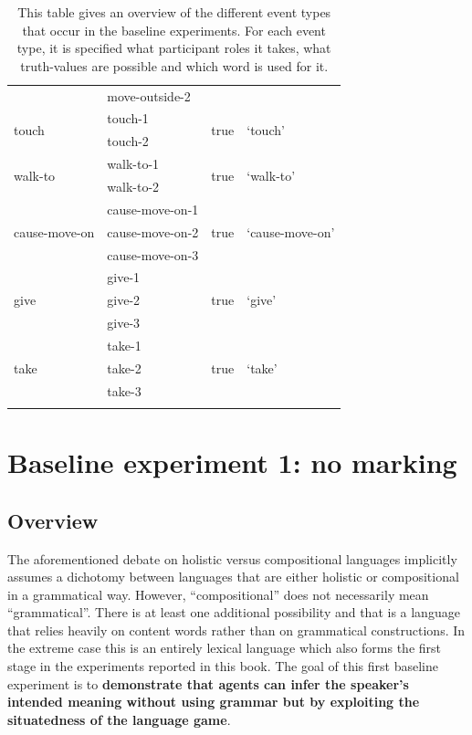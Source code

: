 \begin{table}[htp]
\begin{tabular}{llll}
\\
  &  move-outside-2 & &
\\[.3em]\multirow{2}{*}{touch } &   touch-1 & \multirow{2}{*}{true} & \multirow{2}{*}{`touch'}
\\
 &  touch-2 & &
\\[.3em]\multirow{2}{*}{walk-to } &  walk-to-1 & \multirow{2}{*}{true} & \multirow{2}{*}{`walk-to'}
\\
 &  walk-to-2 & &
\\[.3em]\multirow{3}{*}{cause-move-on } &  cause-move-on-1 & \multirow{3}{*}{true} & \multirow{3}{*}{`cause-move-on'}
\\
  &  cause-move-on-2  & &
\\
  &  cause-move-on-3  & &
\\[.3em]\multirow{3}{*}{give } &  give-1 & \multirow{3}{*}{true} & \multirow{3}{*}{`give'}
\\
 &   give-2 & &
\\
  &  give-3  & &
\\[.3em]\multirow{3}{*}{take } & take-1 & \multirow{3}{*}{true} & \multirow{3}{*}{`take'}
\\
  &   take-2  & &
\\
 &   take-3  & &
\\
\lspbottomrule
 \end{tabular}
\caption[Event-types and their corresponding words]{This table gives an overview of the different event types that occur in the baseline experiments. For each event type, it is specified what participant roles it takes, what truth-values are possible and which word is used for it.}
\label{t:events}
\end{table}

\section{Baseline experiment 1: no marking}
\label{s:base1}

\subsection{Overview}

The aforementioned debate on holistic versus compositional languages implicitly assumes a dichotomy between languages that are either holistic or compositional in a grammatical way. However,  ``compositional'' does not necessarily mean ``grammatical''. There is at least one additional possibility and that is a language that relies heavily on content words rather than on grammatical constructions. In the extreme case this is an entirely lexical language which also forms the first stage in the experiments reported in this book. The goal of this first baseline experiment is to {\bfseries demonstrate that agents can infer the speaker's intended meaning without using grammar but by exploiting the situatedness of the language game}.

